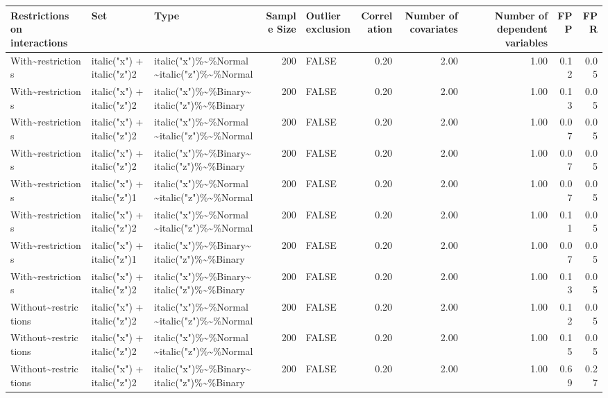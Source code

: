 \begin{table}[ht]
\centering
\begin{tabular}{lllrlrrrrr}
  \hline
Restrictions on interactions & Set & Type & Sample Size & Outlier exclusion & Correlation & Number of covariates & Number of dependent variables & FPP & FPR \\ 
  \hline
With\~{}restrictions & italic("x") + italic("z")2 & italic("x")\%\~{}\%Normal\~{}italic("z")\%\~{}\%Normal & 200 & FALSE & 0.20 & 2.00 & 1.00 & 0.12 & 0.05 \\ 
  With\~{}restrictions & italic("x") + italic("z")2 & italic("x")\%\~{}\%Binary\~{}italic("z")\%\~{}\%Binary & 200 & FALSE & 0.20 & 2.00 & 1.00 & 0.13 & 0.05 \\ 
  With\~{}restrictions & italic("x") + italic("z")2 & italic("x")\%\~{}\%Normal\~{}italic("z")\%\~{}\%Normal & 200 & FALSE & 0.20 & 2.00 & 1.00 & 0.07 & 0.05 \\ 
  With\~{}restrictions & italic("x") + italic("z")2 & italic("x")\%\~{}\%Binary\~{}italic("z")\%\~{}\%Binary & 200 & FALSE & 0.20 & 2.00 & 1.00 & 0.07 & 0.05 \\ 
  With\~{}restrictions & italic("x") + italic("z")1 & italic("x")\%\~{}\%Normal\~{}italic("z")\%\~{}\%Normal & 200 & FALSE & 0.20 & 2.00 & 1.00 & 0.07 & 0.05 \\ 
  With\~{}restrictions & italic("x") + italic("z")2 & italic("x")\%\~{}\%Normal\~{}italic("z")\%\~{}\%Normal & 200 & FALSE & 0.20 & 2.00 & 1.00 & 0.11 & 0.05 \\ 
  With\~{}restrictions & italic("x") + italic("z")1 & italic("x")\%\~{}\%Binary\~{}italic("z")\%\~{}\%Binary & 200 & FALSE & 0.20 & 2.00 & 1.00 & 0.07 & 0.05 \\ 
  With\~{}restrictions & italic("x") + italic("z")2 & italic("x")\%\~{}\%Binary\~{}italic("z")\%\~{}\%Binary & 200 & FALSE & 0.20 & 2.00 & 1.00 & 0.13 & 0.05 \\ 
  Without\~{}restrictions & italic("x") + italic("z")2 & italic("x")\%\~{}\%Normal\~{}italic("z")\%\~{}\%Normal & 200 & FALSE & 0.20 & 2.00 & 1.00 & 0.12 & 0.05 \\ 
  Without\~{}restrictions & italic("x") + italic("z")2 & italic("x")\%\~{}\%Normal\~{}italic("z")\%\~{}\%Normal & 200 & FALSE & 0.20 & 2.00 & 1.00 & 0.15 & 0.05 \\ 
  Without\~{}restrictions & italic("x") + italic("z")2 & italic("x")\%\~{}\%Binary\~{}italic("z")\%\~{}\%Binary & 200 & FALSE & 0.20 & 2.00 & 1.00 & 0.69 & 0.27 \\ 

\end{tabular}
\end{table}
